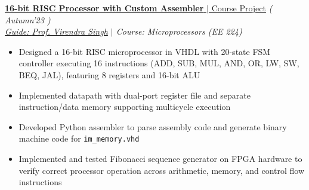 \begin{flushleft}
	\vspace{-6pt}
	\href{https://github.com/Bhuvansh-Goyal-IITB/CPU-16-bit}{\textbf{16-bit RISC Processor with Custom Assembler} $|$ Course Project}
	\hfill{ \small{\it( Autumn'23 )}}
	\\

	\hspace{-3pt}\textit{ \href{https://www.ee.iitb.ac.in/~viren/}{Guide: {Prof. Virendra Singh}}
	$|$ Course: Microprocessors (EE 224)} \\
	\vspace{-7pt}

	\begin{itemize}[itemsep = -0.75 mm, leftmargin=*]
		\item Designed a 16-bit RISC microprocessor in VHDL with 20-state FSM controller executing 16 instructions (ADD, SUB, MUL, AND, OR, LW, SW, BEQ, JAL), featuring 8 registers and 16-bit ALU
		\item Implemented datapath with dual-port register file and separate instruction/data memory supporting multicycle execution
		\item Developed Python assembler to parse assembly code and generate binary machine code for \texttt{im\_memory.vhd}
		\item Implemented and tested Fibonacci sequence generator on FPGA hardware to verify correct processor operation across arithmetic, memory, and control flow instructions
	\end{itemize}
\end{flushleft}
